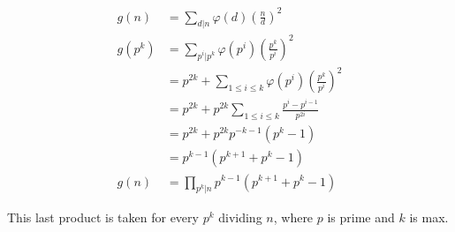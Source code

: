 \documentclass{letter}
\begin{document}
\begin{letter}{}
  \begin{align*}
  g(n) &= 
       \sum_{d|n}\varphi(d)\left(\frac{n}{d}\right)^2 \\
  g(p^k) &= 
     \sum_{p^i|p^k}\varphi(p^i)\left(\frac{p^k}{p^i}\right)^2 \\
     &= p^{2k}+\sum_{1\le i\le k}\varphi(p^i)\left(\frac{p^k}{p^i}\right)^2 \\
     &= p^{2k}+p^{2k}\sum_{1\le i\le k}\frac{p^i-p^{i-1}}{p^{2i}} \\
     &= p^{2k}+p^{2k} p^{-k-1}\left(p^k-1\right) \\
     &= p^{k-1}\left(p^{k+1}+p^k-1\right)\\
  g(n) &= \prod_{p^k|n}
     p^{k-1}\left(p^{k+1}+p^k-1\right)
  \end{align*}

  This last product is taken for every $p^k$ dividing $n$, where $p$ is prime and $k$ is max.


\end{letter}
\end{document}
